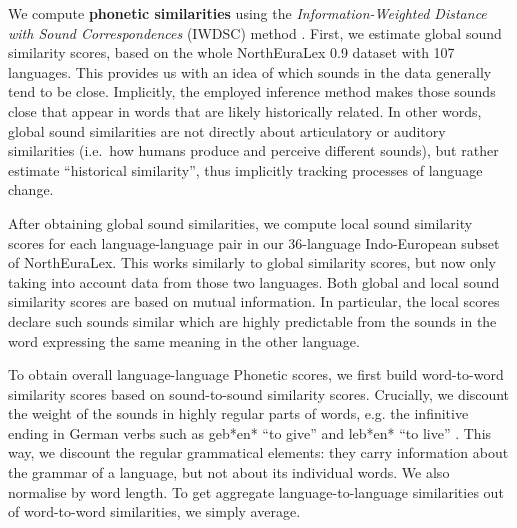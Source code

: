 \documentclass[a4]{article}
\newcommand{\+}[1]{\mathbf{#1}}
\begin{document}

We compute \textbf{phonetic similarities} using the \emph{Information-Weighted Distance with Sound Correspondences} (IWDSC) method \cite{Dellert-2018}. First, we estimate global sound similarity scores, based on the whole NorthEuraLex 0.9 dataset with 107 languages. This provides us with an idea of which sounds in the data generally tend to be close. Implicitly, the employed inference method makes those sounds close that appear in words that are likely historically related. In other words, global sound similarities are not directly about articulatory or auditory similarities (i.e.~how humans produce and perceive different sounds), but rather estimate ``historical similarity'', thus implicitly tracking processes of language change. 

After obtaining global sound similarities, we compute local sound similarity scores for each language-language pair in our 36-language Indo-European subset of NorthEuraLex. This works similarly to global similarity scores, but now only taking into account data from those two languages. Both global and local sound similarity scores are based on mutual information. In particular, the local scores declare  such sounds similar which are highly predictable from the sounds in the word expressing the same meaning in the other language. 

To obtain overall language-language Phonetic scores, we first build word-to-word similarity scores based on sound-to-sound similarity scores. Crucially, we discount the weight of the sounds in highly regular parts of words,
e.g. the infinitive ending in German verbs such as geb*en* ``to give'' and leb*en* ``to live''  \cite{Dellert-Buch-2018}. This way, we discount the regular grammatical elements: they carry information about the grammar of a language, but not about its individual words. We also normalise by word length. To get aggregate language-to-language similarities out of word-to-word similarities, we simply average. 
 
\end{document}
